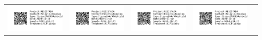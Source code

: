\documentclass[10pt,notitlepage,letterpaper]{article}
\def\s{\phantom{xx}}
\def\w{1.27in}
\begin{document}
\begin{tabular}[t]{ c @{\s} c @{\s} c @{\s} c @{\s} c }
\includegraphics[width=\w]{label_N261_266_Cl} & \includegraphics[width=\w]{label_N262_272_Cl} & \includegraphics[width=\w]{label_N263_282_Cl} & \includegraphics[width=\w]{label_N264_284_Cl} & 
\end{tabular}
\end{document}
